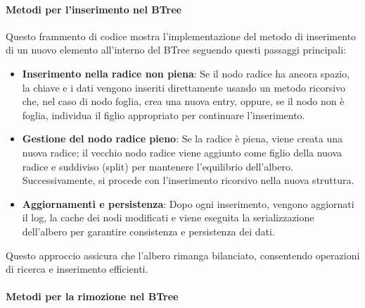 \documentclass[12pt,a4paper,openright,twoside]{book}
\begin{document}
                    

                    \clearpage

                \paragraph{Metodi per l'inserimento nel BTree}

                    Questo frammento di codice mostra l'implementazione del metodo di inserimento di un nuovo elemento all'interno del BTree seguendo questi passaggi principali:

                    \begin{itemize}
                        \item \textbf{Inserimento nella radice non piena}: Se il nodo radice ha ancora spazio, la chiave e i dati vengono inseriti direttamente usando un metodo ricorsivo che, nel caso di nodo foglia, crea una nuova entry, oppure, se il nodo non è foglia, individua il figlio appropriato per continuare l'inserimento.
                        \item \textbf{Gestione del nodo radice pieno}: Se la radice è piena, viene creata una nuova radice; il vecchio nodo radice viene aggiunto come figlio della nuova radice e suddiviso (split) per mantenere l'equilibrio dell'albero. Successivamente, si procede con l'inserimento ricorsivo nella nuova struttura.
                        \item \textbf{Aggiornamenti e persistenza}: Dopo ogni inserimento, vengono aggiornati il log, la cache dei nodi modificati e viene eseguita la serializzazione dell'albero per garantire consistenza e persistenza dei dati.
                    \end{itemize}

                    Questo approccio assicura che l'albero rimanga bilanciato, consentendo operazioni di ricerca e inserimento efficienti.

                    

                    \clearpage

                \paragraph{Metodi per la rimozione nel BTree}
\end{document}
